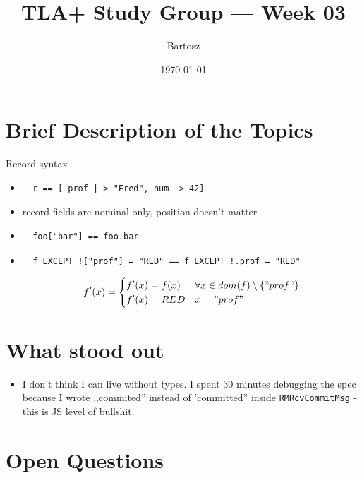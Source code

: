 \documentclass[11pt]{article}
\title{TLA+ Study Group — Week 03}
\author{Bartosz}
\date{\today}
\begin{document}
\maketitle

\section*{Brief Description of the Topics}

Record syntax
\begin{itemize}
\item {
  \begin{verbatim}
  r == [ prof |-> "Fred", num -> 42]
  \end{verbatim}
}
\item {
  record fields are nominal only, position doesn't matter
}
\item {
  \begin{verbatim}
  foo["bar"] == foo.bar
  \end{verbatim}
}
\item {
  \begin{verbatim}
  f EXCEPT !["prof"] = "RED" == f EXCEPT !.prof = "RED"
  \end{verbatim}
  \[
  f'(x) = \begin{cases}
    f'(x) = f(x) & \forall x \in dom(f) \setminus \{"prof"\} \\
    f'(x) = RED  & x = "prof"
  \end{cases}
  \]
}
\end{itemize}

\section*{What stood out}
\begin{itemize}
  \item {
    I don't think I can live without types. I spent 30 minutes debugging the
    spec because I wrote ,,commited'' instead of 'committed'' inside
    \texttt{RMRcvCommitMsg} - this is JS level of bullshit.
  }
\end{itemize}

\section*{Open Questions}
\end{document}

